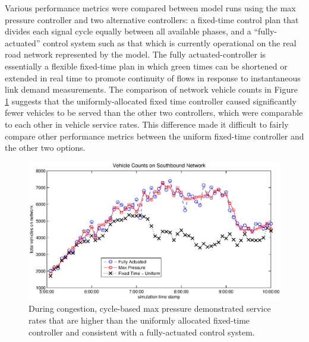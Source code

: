 Various performance metrics were compared between model runs using the max pressure controller and two alternative controllers: a fixed-time control plan that divides each signal cycle equally between all available phases, and a ``fully-actuated'' control system such as that which is currently operational on the real road network represented by the model. The fully actuated-controller is essentially a flexible fixed-time plan in which green times can be shortened or extended in real time to promote continuity of flows in response to instantaneous link demand measurements. 
The comparison of network vehicle counts in Figure \ref{fig_counts} suggests that the uniformly-allocated fixed time controller caused significantly fewer vehicles to be served than the other two controllers, which were comparable to each other in vehicle service rates. This difference made it difficult to fairly compare other performance metrics between the uniform fixed-time controller and the other two options. 
\begin{figure}[h!]
\centering
\includegraphics[width=\columnwidth]{./VehicleCountsPlot.eps}
\vspace{-2em}
\caption{During congestion, cycle-based max pressure demonstrated service rates that are higher than the uniformly allocated fixed-time controller and consistent with a fully-actuated control system.  \label{fig_counts}}
\end{figure}
